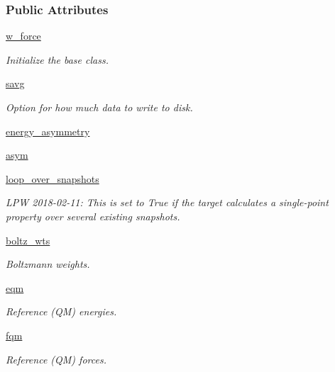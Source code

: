 \subsubsection*{Public Attributes}
\begin{DoxyCompactItemize}
\item 
\hyperlink{classsrc_1_1abinitio_1_1AbInitio_a57931eef3ca6d8ac0ade2ffc1f008ef4}{w\+\_\+force}
\begin{DoxyCompactList}\small\item\em Initialize the base class. \end{DoxyCompactList}\item 
\hyperlink{classsrc_1_1abinitio_1_1AbInitio_a2a0e84edd38e6d52983769ac338d704e}{savg}
\begin{DoxyCompactList}\small\item\em Option for how much data to write to disk. \end{DoxyCompactList}\item 
\hyperlink{classsrc_1_1abinitio_1_1AbInitio_a236b7a6a56af6a2ac2f0cc0bc8fab004}{energy\+\_\+asymmetry}
\item 
\hyperlink{classsrc_1_1abinitio_1_1AbInitio_a472fb76548806e05b499d97c17776a33}{asym}
\item 
\hyperlink{classsrc_1_1abinitio_1_1AbInitio_a4f584318b0b52d54f9d051e1f35b0d81}{loop\+\_\+over\+\_\+snapshots}
\begin{DoxyCompactList}\small\item\em L\+PW 2018-\/02-\/11\+: This is set to True if the target calculates a single-\/point property over several existing snapshots. \end{DoxyCompactList}\item 
\hyperlink{classsrc_1_1abinitio_1_1AbInitio_a38db8e6403bfb6f362c52e2441e7786d}{boltz\+\_\+wts}
\begin{DoxyCompactList}\small\item\em Boltzmann weights. \end{DoxyCompactList}\item 
\hyperlink{classsrc_1_1abinitio_1_1AbInitio_a3c00c716389876408a957c24ec95b9b6}{eqm}
\begin{DoxyCompactList}\small\item\em Reference (QM) energies. \end{DoxyCompactList}\item 
\hyperlink{classsrc_1_1abinitio_1_1AbInitio_a8ade8ee6cf57e840bc80a54380be4092}{fqm}
\begin{DoxyCompactList}\small\item\em Reference (QM) forces. \end{DoxyCompactList}\item 

\end{DoxyCompactItemize}
